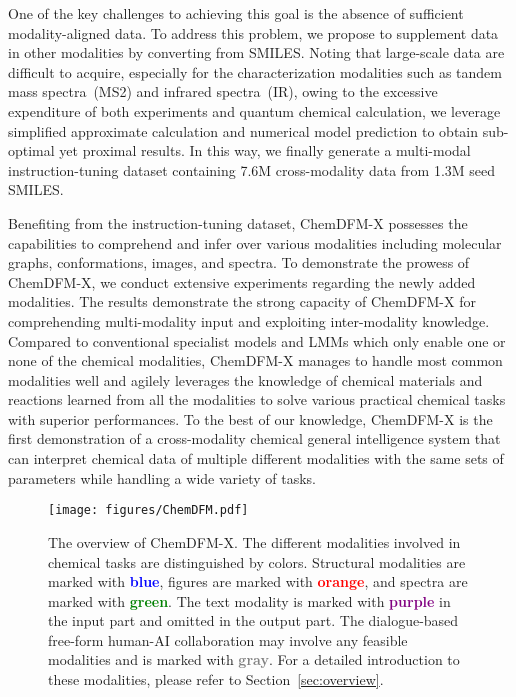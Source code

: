 One of the key challenges to achieving this goal is the absence of sufficient modality-aligned data. To address this problem, we propose to supplement data in other modalities by converting from SMILES. Noting that large-scale data are difficult to acquire, especially for the characterization modalities such as tandem mass spectra~(MS2) and infrared spectra~(IR), owing to the excessive expenditure of both experiments and quantum chemical calculation, we leverage simplified approximate calculation and numerical model prediction to obtain sub-optimal yet proximal results. In this way, we finally generate a multi-modal instruction-tuning dataset containing 7.6M cross-modality data from 1.3M seed SMILES.

Benefiting from the instruction-tuning dataset, ChemDFM-X possesses the capabilities to comprehend and infer over various modalities including molecular graphs, conformations, images, and spectra.
To demonstrate the prowess of ChemDFM-X, we conduct extensive experiments regarding the newly added modalities. 
The results demonstrate the strong capacity of ChemDFM-X for comprehending multi-modality input and exploiting inter-modality knowledge. Compared to conventional specialist models and LMMs which only enable one or none of the chemical modalities, ChemDFM-X manages to handle most common modalities well and agilely leverages the knowledge of chemical materials and reactions learned from all the modalities to solve various practical chemical tasks with superior performances.
To the best of our knowledge, ChemDFM-X is the first demonstration of a cross-modality chemical general intelligence system that can interpret chemical data of multiple different modalities with the same sets of parameters while handling a wide variety of tasks.

\begin{figure}[t]
        \centering
        \texttt{[image: figures/ChemDFM.pdf]}
        \caption{The overview of ChemDFM-X. The different modalities involved in chemical tasks are distinguished by colors. Structural modalities are marked with \textcolor{blue}{\bf blue}, figures are marked with \textcolor{red}{\textbf{orange}}, and spectra are marked with \textcolor{green}{\textbf{green}}. The text modality is marked with \textcolor{purple}{\textbf{purple}} in the input part and omitted in the output part. The dialogue-based free-form human-AI collaboration may involve any feasible modalities and is marked with \textcolor{gray}{\textbf{gray}}. For a detailed introduction to these modalities, please refer to Section~\ref{sec:overview}.}
        \label{figure:overview}
    \end{figure}
